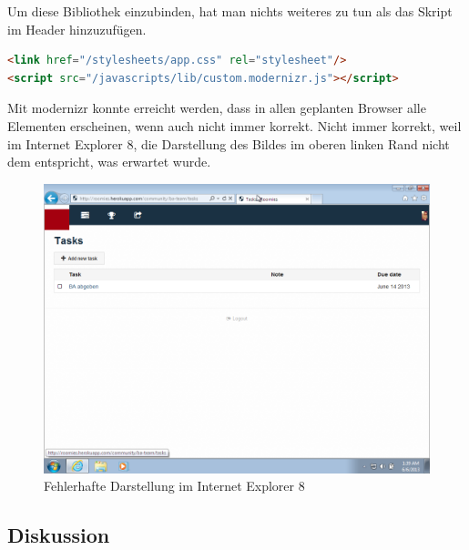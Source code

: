 Um diese Bibliothek einzubinden, hat man nichts weiteres zu tun als das Skript im Header hinzuzufügen.

\begin{lstlisting}[language=HTML, caption=Einbinden von modernizr \cite{roomiesLayout}, firstnumber=11, label=lst:mdernizrLayoutServer]
<link href="/stylesheets/app.css" rel="stylesheet"/>
<script src="/javascripts/lib/custom.modernizr.js"></script>
\end{lstlisting}

Mit modernizr konnte erreicht werden, dass in allen geplanten Browser alle Elementen erscheinen, wenn auch nicht immer korrekt. Nicht immer korrekt, weil im Internet Explorer 8, die Darstellung des Bildes im oberen linken Rand nicht dem entspricht, was erwartet wurde.

\begin{figure}[H]
	\centering
	\includegraphics[width=12cm]{content/principle-demonstration/images/progressive-enhancement-ie8.png}
	\caption{Fehlerhafte Darstellung im Internet Explorer 8}
	\label{fig:iossafari-datepicker}
\end{figure}

\subsection*{Diskussion}

